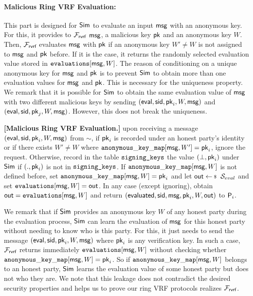 \paragraph{Malicious Ring VRF Evaluation:} This part is designed for $ \mathsf{Sim} $ to evaluate an input $ \mathsf{msg} $ with an anonymous key. For this,  it  provides to $ \mathcal{F}_{\textsf{rvrf}} $  $ \mathsf{msg} $, a malicious key $ \mathsf{pk} $ and an anonymous key $ W $.  Then, $ \mathcal{F}_{\textsf{rvrf}} $ evaluates  $ \mathsf{msg} $ with $ \mathsf{pk} $ if an anonymous key $ W' \neq W$  is not assigned to $ \mathsf{msg} $ and $ \mathsf{pk} $ before.  If it is the case, it returns the randomly selected evaluation value stored  in $ \texttt{evaluations}[\mathsf{msg}, W] $. The reason of conditioning on a unique anonymous key for $ \mathsf{msg} $ and $ \mathsf{pk} $ is to prevent $ \mathsf{Sim} $ to obtain more than one evaluation values for $ \mathsf{msg} $ and $ \mathsf{pk} $. This is necessary for the uniqueness property.
We remark that it is possible  for $ \mathsf{Sim} $ to  obtain the same evaluation value of $ \mathsf{msg} $ with two different malicious  keys  by sending $ (\mathsf{eval}, \textsf{sid}, \mathsf{pk}_i, W, \mathsf{msg}) $ and $(\mathsf{eval}, \textsf{sid}, \mathsf{pk}_j, W, \mathsf{msg})$. However, this does not break the uniqueness.

\begin{tcolorbox}[left=2pt,right=2pt]
	\eprint{}{\scriptsize}
	\textbf{[Malicious Ring VRF Evaluation.]}  upon receiving a message $(\mathsf{eval}, \textsf{sid}, \mathsf{pk}_i, W, \mathsf{msg})$ from $\sim$, if $ \mathsf{pk}_i $ is recorded under an honest party's identity or if there exists $ W'\neq W $ where $ \mathtt{anonymous\_key\_map}[\mathsf{msg},W'] = \mathsf{pk}_i $, ignore the request.
	Otherwise, record in the table $\texttt{signing\_keys}$ the value $(\perp,\mathsf{pk}_i)$ under $\mathsf{Sim}$ if $ (.,\mathsf{pk}_i) $ is not in $ \texttt{signing\_keys} $.
	If  $\mathtt{anonymous\_key\_map}[\mathsf{msg},W]  $ is not defined before, set $ \mathtt{anonymous\_key\_map}[\mathsf{msg},W] = \mathsf{pk}_i $ and let   $\Out \leftsample \setsym{S}_{eval}$ and set $ \texttt{evaluations}[\mathsf{msg}, W] = {\mathsf{out}}$.
	In any case (except ignoring), obtain $ {\mathsf{out}} = \texttt{evaluations}[\mathsf{msg}, W] $ and return $(\mathsf{evaluated}, \textsf{sid},  \mathsf{msg}, \mathsf{pk}_i,W, {\mathsf{out}})$ to $ \mathsf{P}_i $.
\end{tcolorbox}

We remark that if $ \mathsf{Sim} $ provides an anonymous key $ W $ of any honest party during  the evaluation process,  $ \mathsf{Sim} $ can learn the  evaluation of  $ \mathsf{msg} $ for this honest party without needing to know who is this party. For this, it just needs to send the message $ (\mathsf{eval}, \textsf{sid}, \mathsf{pk}_i,W,\mathsf{msg}) $ where $ \mathsf{pk}_i $ is any  verification key. In such a case, $ \mathcal{F}_{\textsf{rvrf}} $  returns immediately $ \texttt{evaluations}[\mathsf{msg}, W] $ without checking whether $ \mathtt{anonymous\_key\_map}[\mathsf{msg},W] = \mathsf{pk}_i $. So if   $ \mathtt{anonymous\_key\_map}[\mathsf{msg},W]  $ belongs to an honest party, $ \mathsf{Sim} $ learns the evaluation value of some honest party but does not who they are. We note that this leakage does not contradict the desired security properties and helps us to prove our ring VRF protocols realizes $ \mathcal{F}_{\textsf{rvrf}} $.  

